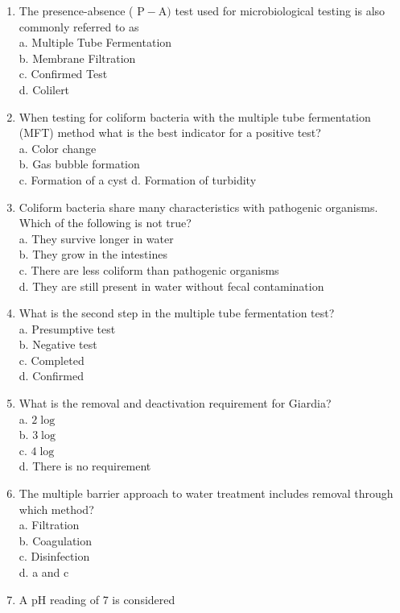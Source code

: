 \begin{enumerate}[1.]
\item The presence-absence ( $\mathrm{P}-\mathrm{A})$ test used for microbiological testing is also commonly referred to as\\
a. Multiple Tube Fermentation\\
b. Membrane Filtration\\
c. Confirmed Test\\
d. Colilert\\
\item When testing for coliform bacteria with the multiple tube fermentation (MFT) method what is the best indicator for a positive test?\\
a. Color change\\
b. Gas bubble formation\\
c. Formation of a cyst d. Formation of turbidity\\
\item Coliform bacteria share many characteristics with pathogenic organisms. Which of the following is not true?\\
a. They survive longer in water\\
b. They grow in the intestines\\
c. There are less coliform than pathogenic organisms\\
d. They are still present in water without fecal contamination\\
\item What is the second step in the multiple tube fermentation test?\\
a. Presumptive test\\
b. Negative test\\
c. Completed\\
d. Confirmed\\
\item What is the removal and deactivation requirement for Giardia?\\
a. $2 \log$\\
b. $3 \log$\\
c. $4 \log$\\
d. There is no requirement\\
\item The multiple barrier approach to water treatment includes removal through which method?\\
a. Filtration\\
b. Coagulation\\
c. Disinfection\\
d. a and c\\
\item A pH reading of 7 is considered\\

\end{enumerate}
